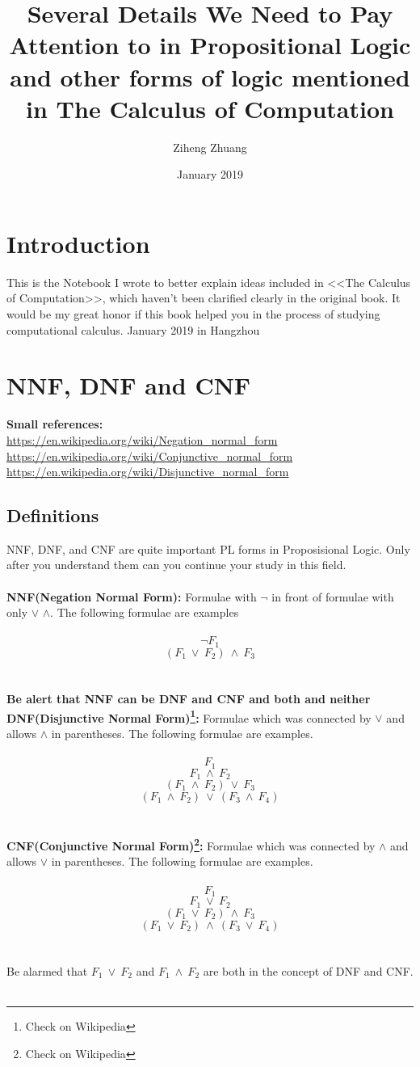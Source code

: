 \documentclass{article}
\author{Ziheng Zhuang}
\title{Several Details We Need to Pay Attention to in Propositional Logic and other forms of logic mentioned in The Calculus of Computation}
\date{January 2019}
\begin{document}
\maketitle
\tableofcontents
\newpage

\section*{Introduction}
This is the Notebook I wrote to better explain ideas included in <<The Calculus of Computation>>, which haven't been clarified clearly in the original book. It would be my great honor if this book helped you in the process of studying computational calculus.
\newline
January 2019 in Hangzhou
\newpage

\section{NNF, DNF and CNF}
\textbf{Small references:}\\
\url{https://en.wikipedia.org/wiki/Negation_normal_form}
\url{https://en.wikipedia.org/wiki/Conjunctive_normal_form}
\url{https://en.wikipedia.org/wiki/Disjunctive_normal_form}

\subsection{Definitions}
NNF, DNF, and CNF are quite important PL forms in Proposisional Logic. Only after you understand them can you continue your study in this field.\\\\
\textbf{NNF(Negation Normal Form):} Formulae with $\neg$ in front of formulae with only $\lor$ $\land$. The following formulae are examples\\\\
$$\neg F_1$$
$$(F_1\ \lor\ F_2)\ \land\ F_3$$\\\\
\textbf{Be alert that NNF can be DNF and CNF and both and neither}
\textbf{DNF(Disjunctive Normal Form)\footnote{Check on Wikipedia}:} Formulae which was connected by $\lor$ and allows $\land$ in parentheses. The following formulae are examples.\\\\
$$F_1$$
$$F_1\ \land\ F_2$$
$$(F_1\ \land\ F_2)\ \lor\ F_3$$
$$(F_1\ \land\ F_2)\ \lor\ (F_3\ \land\ F_4)$$\\\\
\textbf{CNF(Conjunctive Normal Form)\footnote{Check on Wikipedia}:} Formulae which was connected by $\land$ and allows $\lor$ in parentheses. The following formulae are examples.\\\\
$$F_1$$
$$F_1\ \lor\ F_2$$
$$(F_1\ \lor\ F_2)\ \land\ F_3$$
$$(F_1\ \lor\ F_2)\ \land\ (F_3\ \lor\ F_4)$$\\\\
Be alarmed that $F_1\ \lor\ F_2$ and $F_1\ \land\ F_2$ are both in the concept of DNF and CNF.\\\\
\end{document}
